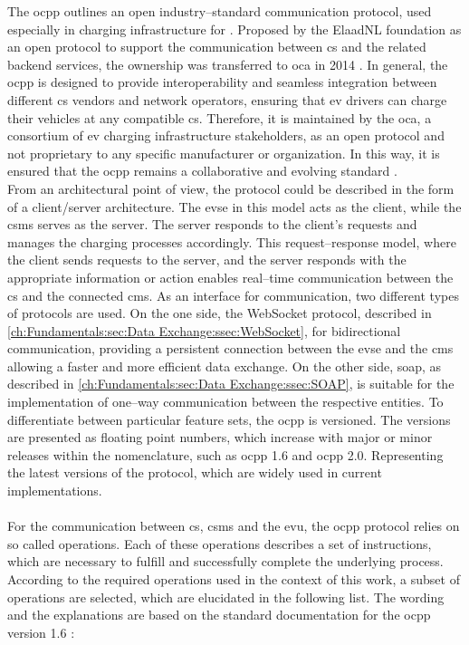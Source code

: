 The \acrfull{ocpp} outlines an open industry--standard communication protocol, used especially in charging infrastructure for . Proposed by the ElaadNL foundation as an open protocol to support the communication between \acrshort{cs} and the related backend services, the ownership was transferred to \acrshort{oca} in 2014 \cite{garofalaki_electric_2022}.
In general, the \acrshort{ocpp} is designed to provide interoperability and seamless integration between different \acrshort{cs} vendors and network operators, ensuring that \acrshort{ev} drivers can charge their vehicles at any compatible \acrshort{cs}.
Therefore, it is maintained by the \acrfull{oca}, a consortium of \acrshort{ev} charging infrastructure stakeholders, as an open protocol and not proprietary to any specific manufacturer or organization. 
In this way, it is ensured that the \acrshort{ocpp} remains a collaborative and evolving standard \cite{noauthor_ocpp_nodate}. \\
From an architectural point of view, the protocol could be described in the form of a client/server architecture. The \acrshort{evse} in this model acts as the client, while the \acrshort{csms} serves as the server. 
The server responds to the client's requests and manages the charging processes accordingly. This request--response model, where the client sends requests to the server, and the server responds with the appropriate information or action enables real--time communication between the \acrfull{cs} and the connected \acrfull{cms}.
As an interface for communication, two different types of protocols are used. On the one side, the WebSocket protocol, described in \ref{ch:Fundamentals:sec:Data Exchange:ssec:WebSocket}, for bidirectional communication, providing a persistent connection between the \acrshort{evse} and the \acrshort{cms} allowing a faster and more efficient data exchange. On the other side, \acrfull{soap}, as described in \ref{ch:Fundamentals:sec:Data Exchange:ssec:SOAP}, is suitable for the implementation of one--way communication between the respective entities.
To differentiate between particular feature sets, the \acrshort{ocpp} is versioned. 
The versions are presented as floating point numbers, which increase with major or minor releases within the nomenclature, such as \acrshort{ocpp} 1.6 and \acrshort{ocpp} 2.0. Representing the latest versions of the protocol, which are widely used in current implementations. \\ \\
\noindent For the communication between \acrshort{cs}, \acrshort{csms} and the \acrshort{evu}, the \acrshort{ocpp} protocol relies on so called operations. Each of these operations describes a set of instructions, which are necessary to fulfill and successfully complete the underlying process.
According to the required operations used in the context of this work, a subset of operations are selected, which are elucidated in the following list. 
The wording and the explanations are based on the standard documentation for the \acrshort{ocpp} version 1.6 \cite{noauthor_ocpp_nodate}:

